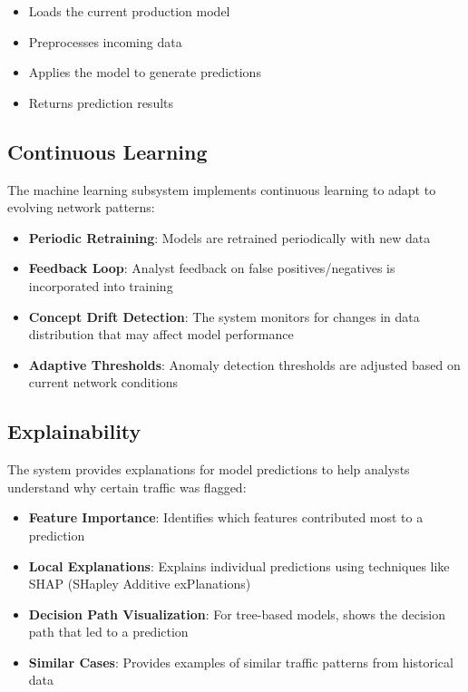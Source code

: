 \begin{itemize}
    \item Loads the current production model
    \item Preprocesses incoming data
    \item Applies the model to generate predictions
    \item Returns prediction results
\end{itemize}

\subsection{Continuous Learning}
The machine learning subsystem implements continuous learning to adapt to evolving network patterns:

\begin{itemize}
    \item \textbf{Periodic Retraining}: Models are retrained periodically with new data
    \item \textbf{Feedback Loop}: Analyst feedback on false positives/negatives is incorporated into training
    \item \textbf{Concept Drift Detection}: The system monitors for changes in data distribution that may affect model performance
    \item \textbf{Adaptive Thresholds}: Anomaly detection thresholds are adjusted based on current network conditions
\end{itemize}

\subsection{Explainability}
The system provides explanations for model predictions to help analysts understand why certain traffic was flagged:

\begin{itemize}
    \item \textbf{Feature Importance}: Identifies which features contributed most to a prediction
    \item \textbf{Local Explanations}: Explains individual predictions using techniques like SHAP (SHapley Additive exPlanations)
    \item \textbf{Decision Path Visualization}: For tree-based models, shows the decision path that led to a prediction
    \item \textbf{Similar Cases}: Provides examples of similar traffic patterns from historical data
\end{itemize}